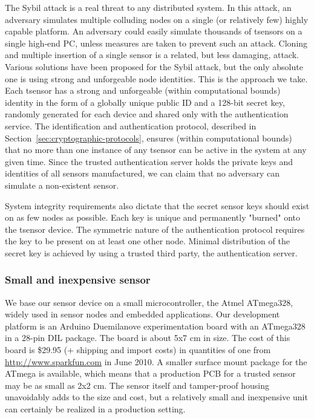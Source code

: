 The Sybil attack \cite{Douceur2002} is a real threat to any distributed system. In this attack, an adversary simulates multiple colluding nodes on a single (or relatively few) highly capable platform. An adversary could easily simulate thousands of tsensors on a single high-end PC, unless measures are taken to prevent such an attack. Cloning and multiple insertion of a single sensor is a related, but less damaging, attack.
%
Various solutions have been proposed for the Sybil attack, but the only absolute one is using strong and unforgeable node identities. This is the approach we take. Each tsensor has a strong and unforgeable (within computational bounds) identity in the form of a globally unique public ID and a 128-bit secret key, randomly generated for each device and shared only with the authentication service. The identification and authentication protocol, described in Section~\ref{sec:cryptographic-protocols}, ensures (within computational bounds) that no more than one instance of any tsensor can be active in the system at any given time. Since the trusted authentication server holds the private keys and identities of all sensors manufactured, we can claim that no adversary can simulate a non-existent sensor.

System integrity requirements also dictate that the secret sensor keys should exist on as few nodes as possible. Each key is unique and permanently "burned" onto the tsensor device. The symmetric nature of the authentication protocol requires the key to be present on at least one other node. Minimal distribution of the secret key is achieved by using a trusted third party, the authentication server.

\subsubsection{Small and inexpensive sensor}

We base our sensor device on a small microcontroller, the Atmel ATmega328, widely used in sensor nodes and embedded applications. Our development platform is an Arduino Duemilanove experimentation board with an ATmega328 in a 28-pin DIL package. The board is about 5x7 cm in size.
The cost of this board is \$29.95 (+ shipping and import costs) in quantities of one from \url{http://www.sparkfun.com} in June 2010. 
%
A smaller surface mount package for the ATmega is available, which means that a production PCB for a trusted sensor may be as small as 2x2 cm. The sensor itself and tamper-proof housing unavoidably adds to the size and cost, but a relatively small and inexpensive unit can certainly be realized in a production setting.

